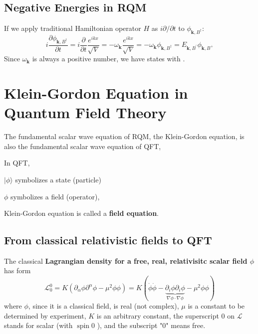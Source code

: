 
\subsection{Negative Energies in RQM}
If we apply traditional Hamiltonian operator $H$ as $i\partial/\partial t$ to $\phi_{\mathbf{k},B^{\dagger}}$:
\begin{equation}
i \frac{\partial \phi_{\mathbf{k}, B^{\dagger}}}{\partial t}=i \frac{\partial}{\partial t} \frac{e^{i k x}}{\sqrt{V}}=-\omega_{\mathbf{k}} \frac{e^{i k x}}{\sqrt{V}}=-\omega_{\mathbf{k}} \phi_{\mathbf{k}, B^{\dagger}}=E_{\mathbf{k}, B^{\prime}} \phi_{\mathbf{k}, B^{+}}
\end{equation}
Since $\omega_{\mathbf{k}}$ is always a positive number, we have states with . 

\section{Klein-Gordon Equation in Quantum Field Theory}
The fundamental scalar wave equation of RQM, the Klein-Gordon equation, is also the fundamental scalar wave equation of QFT,

\begin{mybox}
In QFT, 
\begin{center}
    $|\phi\rangle$ symbolizes a state (particle)

$\phi$ symbolizes a field (operator),

Klein-Gordon equation is called a \textbf{field equation}.
\end{center}
\end{mybox}
\subsection{From classical relativistic fields to QFT}
The classical \textbf{Lagrangian density for a free, real, relativisitc scalar field $\phi$} has form
\begin{equation}
\mathcal{L}_{0}^{0}=K\left(\partial_{\alpha} \phi \partial^{\alpha} \phi-\mu^{2} \phi \phi\right)=
K\left(\dot{\phi} \dot{\phi}-\underbrace{\partial_{i} \phi \partial_{i} \phi}_{\nabla \phi \cdot \nabla \phi}-\mu^{2} \phi \phi\right)
\label{classical-scalar-fields}
\end{equation}
where $\phi$, since it is a classical field, is real (not complex), $\mu$ is a constant to be determined by experiment, $K$ is an arbitrary constant, the superscript $0$ on $\mathcal{L}$ stands for scalar (with $\operatorname{spin} 0$ ), and the subscript "0" means free.

